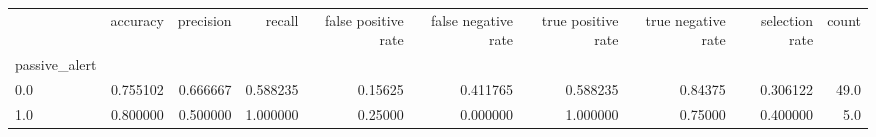 \begin{tabular}{lrrrrrrrrr}
\toprule
{} &  accuracy &  precision &    recall &  false positive rate &  false negative rate &  true positive rate &  true negative rate &  selection rate &  count \\
passive\_alert &           &            &           &                      &                      &                     &                     &                 &        \\
\midrule
0.0           &  0.755102 &   0.666667 &  0.588235 &              0.15625 &             0.411765 &            0.588235 &             0.84375 &        0.306122 &   49.0 \\
1.0           &  0.800000 &   0.500000 &  1.000000 &              0.25000 &             0.000000 &            1.000000 &             0.75000 &        0.400000 &    5.0 \\
\bottomrule
\end{tabular}
